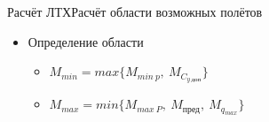 \begin{frame}{Расчёт ЛТХ}{Расчёт области возможных полётов}
    \begin{minipage}[c]{0.55\textwidth}
    \end{minipage}
    \begin{minipage}[c]{0.4\textwidth}
        \begin{itemize}
            \item [] \begin{block}{Определение области}
                \begin{itemize}
                    \item $M_{min} = max \{ M_{min \ p}, \ M_{C_{y \ \text{доп}}} \} $
                    \item $M_{max} = min \{ M_{max \ P}, \ M_{\text{пред}}, \ M_{q_{max}} \}$
                \end{itemize}
            \end{block}
        \end{itemize}
    \end{minipage}
\end{frame}

